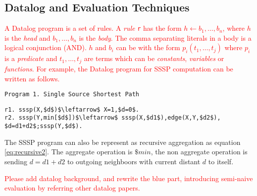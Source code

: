 
\subsection{Datalog and Evaluation Techniques}

\textcolor{red}{A Datalog program is a set of rules. A \emph{rule} \texttt{r} has the form $h\leftarrow b_1,\ldots,b_n$, where $h$ is the \emph{head} and $b_1,\ldots,b_n$ is the \emph{body}. The comma separating literals in a body is a logical conjunction (AND). $h$ and $b_i$ can be with the form $p_i(t_1,\ldots,t_j)$ where $p_i$ is a \emph{predicate} and $t_1,\ldots,t_j$ are terms which can be \emph{constants}, \emph{variables} or \emph{functions}. For example, the Datalog program for SSSP computation can be written as follows.}
\begin{verbatim}
Program 1. Single Source Shortest Path
\end{verbatim}
\vspace{-0.1in}
\small
\begin{lstlisting}
r1. sssp(X,$d$)$\leftarrow$ X=1,$d=0$.
r2. sssp(Y,min[$d$])$\leftarrow$ sssp(X,$d1$),edge(X,Y,$d2$),
$d=d1+d2$;sssp(Y,$d$).
\end{lstlisting}
\normalsize
The SSSP program can also be represent as recursive aggregation as equation \ref{eq:recursive2}. The aggregate operation is $\$min$, the non aggregate operation is sending $d=d1+d2$ to outgoing neighboors with current distant $d$ to itself.

\textcolor{red}{Please add datalog background, and rewrite the blue part, introducing semi-naive evaluation by referring other datalog papers.}


